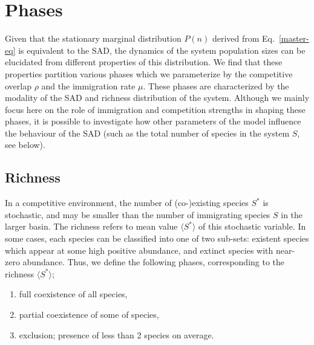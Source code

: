 \documentclass[9pt,lineno]{elife}
\begin{document}
\section{Phases} 
\label{sec:Phases}
Given that the stationary marginal distribution $P(n)$ derived from Eq.~\eqref{master-eq} is equivalent to the SAD, the dynamics of the system population sizes can be elucidated from different properties of this distribution.
We find that these properties partition various phases which we parameterize by the competitive overlap $\rho$ and the immigration rate $\mu$.
These phases are characterized by the modality of the SAD and richness distribution of the system.
Although we mainly focus here on the role of immigration and competition strengths in shaping these phases, it is possible to investigate how other parameters of the model influence the behaviour of the SAD (such as the total number of species in the system $S$, see below).

\subsection{Richness}

In a competitive environment, the number of (co-)existing species $S^*$ is stochastic, and may be smaller than the number of immigrating species $S$ in the larger basin. 
The richness refers to mean value $\langle S^*\rangle$ of this stochastic variable.
%
In some cases, each species can be classified into one of two sub-sets: existent species which appear at some high positive abundance, and extinct species with near-zero abundance.
%
Thus, we define the following phases, corresponding to the richness {$\langle S^* \rangle$};
\begin{enumerate}[label=(\alph*)]
    \item full coexistence of all species,
    \item partial coexistence of some of species,
    \item exclusion; presence of less than 2 species on average.
\end{enumerate}

\end{document}
